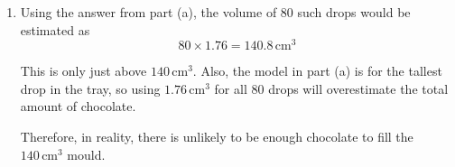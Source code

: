 \documentclass[leqno]{article}
\begin{document}
\begin{enumerate}[
  label=\textbf{\arabic*.},
  leftmargin=*,
  topsep=0pt,
  partopsep=0pt,
  parsep=0pt
]
\begin{djsSolution}
\begin{enumerate}[label=\textbf{(\alph*)}]
we rearrange to get
\[
x^2=\frac{8-6y^2-y\sin(2y)}{20}
\]

When this curve is rotated about the $y$-axis, the volume is
\[
V=\pi\int_a^b x^2\,\mathrm{d}y
\]

So
\[
V=\frac{\pi}{20}\int_{-1.088}^{1.088}\left(8-6y^2-y\sin(2y)\right)\,\mathrm{d}y
\]

Using integration by parts for $\int -y\sin(2y)\,\mathrm{d}y$, let
\[
u=y, \qquad \frac{\mathrm{d}v}{\mathrm{d}y}=-\sin(2y)
\]

Then
\[
\frac{\mathrm{d}u}{\mathrm{d}y}=1, \qquad v=\frac12\cos(2y)
\]

Hence
\begin{align*}
\int -y\sin(2y)\,\mathrm{d}y
&=uv-\int v\,\frac{\mathrm{d}u}{\mathrm{d}y}\,\mathrm{d}y\\
&=\frac{y}{2}\cos(2y)-\int \frac12\cos(2y)\,\mathrm{d}y\\
&=\frac{y}{2}\cos(2y)-\frac14\sin(2y)+c
\end{align*}

Therefore
\begin{align*}
V&=\frac{\pi}{20}\left[8y-2y^3+\frac{y}{2}\cos(2y)-\frac14\sin(2y)\right]_{-1.088}^{1.088}\\
&\approx 1.763\ldots
\end{align*}

Hence, according to the model, the volume of the chocolate drop is $1.76\,\mathrm{cm}^3$.

  \item Using the answer from part (a), the volume of 80 such drops would be estimated as
\[
80\times 1.76=140.8\,\mathrm{cm}^3
\]

This is only just above $140\,\mathrm{cm}^3$. Also, the model in part (a) is for the tallest drop in the tray, so using $1.76\,\mathrm{cm}^3$ for all 80 drops will overestimate the total amount of chocolate.

Therefore, in reality, there is unlikely to be enough chocolate to fill the $140\,\mathrm{cm}^3$ mould.
\end{enumerate}
\end{djsSolution}


\newpage

\questionitem

\begin{figure}[H]
    \centering
{}
\end{figure}
\end{enumerate}
\end{document}
